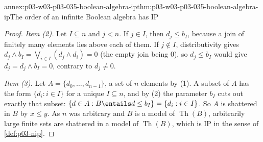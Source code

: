 \begin{annexitem}{annex:p03-w03-p03-035-boolean-algebra-ip}{thm:p03-w03-p03-035-boolean-algebra-ip}{The order of an infinite Boolean algebra has IP}
\begin{proof}
\emph{Item \textup{(2)}.}  Let \(I\subseteq n\) and \(j<n\).  If \(j\in I\),
then \(d_j\leq b_I\), because a join of finitely many elements lies above each
of them.  If \(j\notin I\), distributivity gives
\(d_j\wedge b_I=\bigvee_{i\in I}(d_j\wedge d_i)=0\) (the empty join being
\(0\)), so \(d_j\leq b_I\) would give \(d_j=d_j\wedge b_I=0\), contrary to
\(d_j\neq 0\).

\emph{Item \textup{(3)}.}  Let \(A=\{d_0,\ldots,d_{n-1}\}\), a set of \(n\)
elements by \textup{(1)}.  A subset of \(A\) has the form
\(\{d_i:i\in I\}\) for a unique \(I\subseteq n\), and by \textup{(2)} the
parameter \(b_I\) cuts out exactly that subset:
\(\{d\in A:B\entails d\leq b_I\}=\{d_i:i\in I\}\).  So \(A\) is shattered in
\(B\) by \(x\leq y\).  As \(n\) was arbitrary and \(B\) is a model of
\(\operatorname{Th}(B)\), arbitrarily large finite sets are shattered in a
model of \(\operatorname{Th}(B)\), which is IP in the sense of
\cref{def:p03-nip}.
\end{proof}
\end{annexitem}

